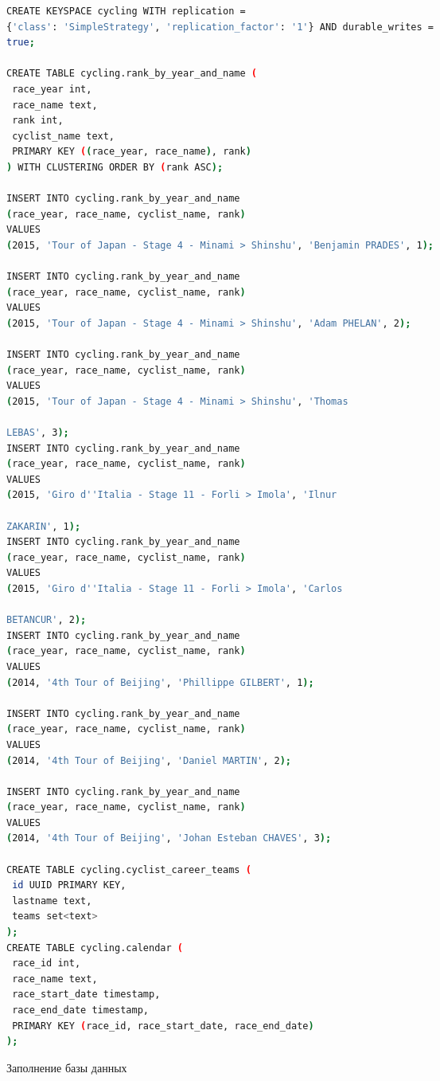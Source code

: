 \begin{lstlisting}[language=bash]
CREATE KEYSPACE cycling WITH replication =
{'class': 'SimpleStrategy', 'replication_factor': '1'} AND durable_writes =
true;

CREATE TABLE cycling.rank_by_year_and_name (
 race_year int,
 race_name text,
 rank int,
 cyclist_name text,
 PRIMARY KEY ((race_year, race_name), rank)
) WITH CLUSTERING ORDER BY (rank ASC);

INSERT INTO cycling.rank_by_year_and_name
(race_year, race_name, cyclist_name, rank)
VALUES
(2015, 'Tour of Japan - Stage 4 - Minami > Shinshu', 'Benjamin PRADES', 1);

INSERT INTO cycling.rank_by_year_and_name
(race_year, race_name, cyclist_name, rank)
VALUES
(2015, 'Tour of Japan - Stage 4 - Minami > Shinshu', 'Adam PHELAN', 2);

INSERT INTO cycling.rank_by_year_and_name
(race_year, race_name, cyclist_name, rank)
VALUES
(2015, 'Tour of Japan - Stage 4 - Minami > Shinshu', 'Thomas

LEBAS', 3);
INSERT INTO cycling.rank_by_year_and_name
(race_year, race_name, cyclist_name, rank)
VALUES
(2015, 'Giro d''Italia - Stage 11 - Forli > Imola', 'Ilnur

ZAKARIN', 1);
INSERT INTO cycling.rank_by_year_and_name
(race_year, race_name, cyclist_name, rank)
VALUES
(2015, 'Giro d''Italia - Stage 11 - Forli > Imola', 'Carlos

BETANCUR', 2);
INSERT INTO cycling.rank_by_year_and_name
(race_year, race_name, cyclist_name, rank)
VALUES
(2014, '4th Tour of Beijing', 'Phillippe GILBERT', 1);

INSERT INTO cycling.rank_by_year_and_name
(race_year, race_name, cyclist_name, rank)
VALUES
(2014, '4th Tour of Beijing', 'Daniel MARTIN', 2);

INSERT INTO cycling.rank_by_year_and_name
(race_year, race_name, cyclist_name, rank)
VALUES
(2014, '4th Tour of Beijing', 'Johan Esteban CHAVES', 3);

CREATE TABLE cycling.cyclist_career_teams (
 id UUID PRIMARY KEY,
 lastname text,
 teams set<text>
);
CREATE TABLE cycling.calendar (
 race_id int,
 race_name text,
 race_start_date timestamp,
 race_end_date timestamp,
 PRIMARY KEY (race_id, race_start_date, race_end_date)
);
\end{lstlisting}

\begin{image}
	\caption{Заполнение базы данных}
	\label{fig:cqlsh:create}
\end{image}

